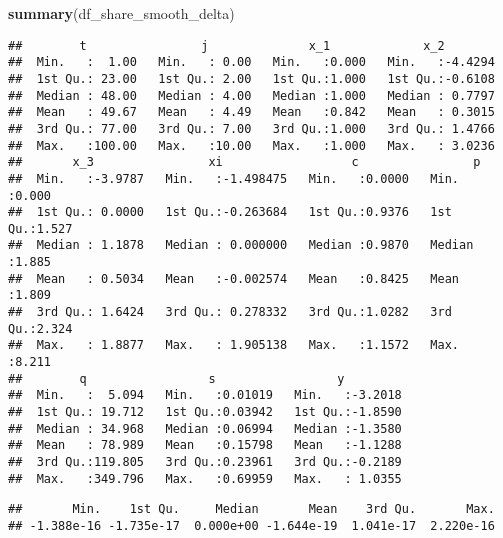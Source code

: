 \documentclass[
]{book}
\newenvironment{Shaded}{\begin{snugshade}}{\end{snugshade}}
\newcommand{\KeywordTok}[1]{\textcolor[rgb]{0.13,0.29,0.53}{\textbf{#1}}}
\newcommand{\NormalTok}[1]{#1}
\newcommand{\OperatorTok}[1]{\textcolor[rgb]{0.81,0.36,0.00}{\textbf{#1}}}
\newcommand{\StringTok}[1]{\textcolor[rgb]{0.31,0.60,0.02}{#1}}
\begin{document}
\begin{Shaded}
\begin{Highlighting}[]
\KeywordTok{summary}\NormalTok{(df_share_smooth_delta)}
\end{Highlighting}
\end{Shaded}

\begin{verbatim}
##        t                j              x_1             x_2         
##  Min.   :  1.00   Min.   : 0.00   Min.   :0.000   Min.   :-4.4294  
##  1st Qu.: 23.00   1st Qu.: 2.00   1st Qu.:1.000   1st Qu.:-0.6108  
##  Median : 48.00   Median : 4.00   Median :1.000   Median : 0.7797  
##  Mean   : 49.67   Mean   : 4.49   Mean   :0.842   Mean   : 0.3015  
##  3rd Qu.: 77.00   3rd Qu.: 7.00   3rd Qu.:1.000   3rd Qu.: 1.4766  
##  Max.   :100.00   Max.   :10.00   Max.   :1.000   Max.   : 3.0236  
##       x_3                xi                  c                p        
##  Min.   :-3.9787   Min.   :-1.498475   Min.   :0.0000   Min.   :0.000  
##  1st Qu.: 0.0000   1st Qu.:-0.263684   1st Qu.:0.9376   1st Qu.:1.527  
##  Median : 1.1878   Median : 0.000000   Median :0.9870   Median :1.885  
##  Mean   : 0.5034   Mean   :-0.002574   Mean   :0.8425   Mean   :1.809  
##  3rd Qu.: 1.6424   3rd Qu.: 0.278332   3rd Qu.:1.0282   3rd Qu.:2.324  
##  Max.   : 1.8877   Max.   : 1.905138   Max.   :1.1572   Max.   :8.211  
##        q                 s                 y          
##  Min.   :  5.094   Min.   :0.01019   Min.   :-3.2018  
##  1st Qu.: 19.712   1st Qu.:0.03942   1st Qu.:-1.8590  
##  Median : 34.968   Median :0.06994   Median :-1.3580  
##  Mean   : 78.989   Mean   :0.15798   Mean   :-1.1288  
##  3rd Qu.:119.805   3rd Qu.:0.23961   3rd Qu.:-0.2189  
##  Max.   :349.796   Max.   :0.69959   Max.   : 1.0355
\end{verbatim}

\begin{Shaded}
\end{Shaded}

\begin{verbatim}
##       Min.    1st Qu.     Median       Mean    3rd Qu.       Max. 
## -1.388e-16 -1.735e-17  0.000e+00 -1.644e-19  1.041e-17  2.220e-16
\end{verbatim}
\end{document}
